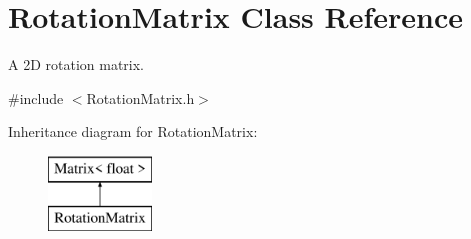 \hypertarget{class_rotation_matrix}{\section{Rotation\+Matrix Class Reference}
\label{class_rotation_matrix}
}


A 2\+D rotation matrix.  




{\ttfamily \#include $<$Rotation\+Matrix.\+h$>$}

Inheritance diagram for Rotation\+Matrix\+:\begin{figure}[H]
\begin{center}
\leavevmode
\includegraphics[height=2.000000cm]{class_rotation_matrix}
\end{center}
\end{figure}
